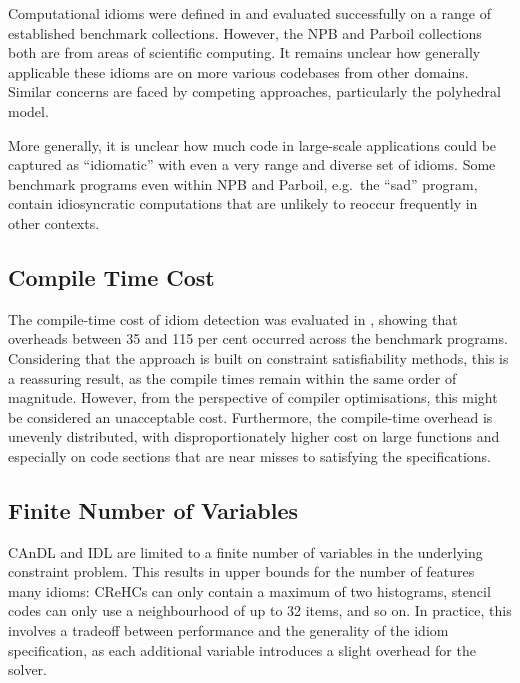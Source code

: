     Computational idioms were defined in
     and
    evaluated successfully on a range of established benchmark collections.
    However, the NPB and Parboil collections both are from areas of scientific
    computing.
    It remains unclear how generally applicable these idioms are on more
    various codebases from other domains.
    Similar concerns are faced by competing approaches, particularly the
    polyhedral model.

    More generally, it is unclear how much code in large-scale applications
    could be captured as ``idiomatic'' with even a very range and diverse set of
    idioms.
    Some benchmark programs even within NPB and Parboil, e.g.\ the ``sad''
    program, contain idiosyncratic computations that are unlikely to reoccur
    frequently in other contexts.

\subsection*{Compile Time Cost}

    The compile-time cost of idiom detection was evaluated in
    , showing that overheads between 35 and 115 per cent
    occurred across the benchmark programs.
    Considering that the approach is built on constraint satisfiability
    methods, this is a reassuring result, as the compile times remain within the
    same order of magnitude.
    However, from the perspective of compiler optimisations, this might be
    considered an unacceptable cost.
    Furthermore, the compile-time overhead is unevenly distributed, with
    disproportionately higher cost on large functions and especially on code
    sections that are near misses to satisfying the specifications.

\subsection*{Finite Number of Variables}

    CAnDL and IDL are limited to a finite number of variables in the underlying
    constraint problem.
    This results in upper bounds for the number of features many idioms:
    CReHCs can only contain a maximum of two histograms, stencil codes can only
    use a neighbourhood of up to 32 items, and so on.
    In practice, this involves a tradeoff between performance and the generality
    of the idiom specification, as each additional variable introduces a slight
    overhead for the solver.

